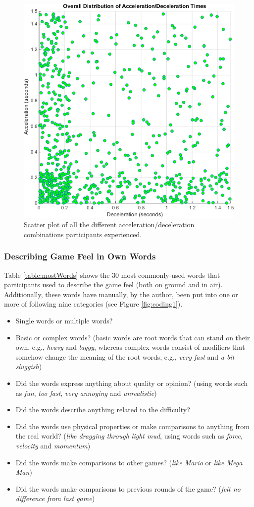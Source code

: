 \begin{figure}[htbp]
\centering
\includegraphics[width=0.7\columnwidth]{Pics/Classes/overall_distribution}
\caption{Scatter plot of all the different acceleration/deceleration combinations participants experienced.}
\label{fig:overallDistribution}
\end{figure}

\subsubsection{Describing Game Feel in Own Words}
Table \ref{table:mostWords} shows the 30 most commonly-used words that participants used to describe the game feel (both on ground and in air). Additionally, these words have manually, by the author, been put into one or more of following nine categories (see Figure \ref{fig:coding1}).
\begin{itemize}[noitemsep,nolistsep]
\item Single words or multiple words?
\item Basic or complex words? (basic words are root words that can stand on their own, e.g., \textit{heavy} and \textit{laggy}, whereas complex words consist of modifiers that somehow change the meaning of the root words, e.g., \textit{very fast} and \textit{a bit sluggish})
\item Did the words express anything about quality or opinion? (using words such as \textit{fun}, \textit{too fast}, \textit{very annoying} and \textit{unrealistic})
\item Did the words describe anything related to the difficulty?
\item Did the words use physical properties or make comparisons to anything from the real world? (\textit{like dragging through light mud}, using words such as \textit{force}, \textit{velocity} and \textit{momentum})
\item Did the words make comparisons to other games? (\textit{like Mario} or \textit{like Mega Man})
\item Did the words make comparisons to previous rounds of the game? (\textit{felt no difference from last game})
\end{itemize}

